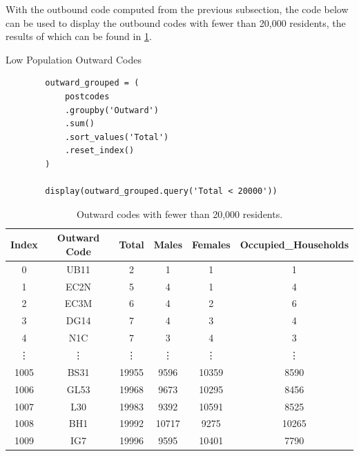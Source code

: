 \documentclass{article}
\begin{document}
With the outbound code computed from the previous subsection, the code below can be used to display the outbound codes with fewer than 20,000 residents, the results of which can be found in \cref{tbl:outbound_codes}.

\begin{mybox}[colbacktitle=green]{Low Population Outward Codes}
    \begin{verbatim}    
        outward_grouped = (
            postcodes
            .groupby('Outward')
            .sum()
            .sort_values('Total')
            .reset_index()
        )

        display(outward_grouped.query('Total < 20000'))

        \end{verbatim}
\end{mybox}


\begin{table}[H]
    \centering
    \caption{Outward codes with fewer than 20,000 residents.}
    \label{tbl:outbound_codes}
    \vspace{0.5\baselineskip}

    \begin{tabular}{@{}cccccc@{}}
    \toprule
    Index   &   Outward Code    & Total & Males & Females & Occupied\_Households \\ \midrule
    0       &   UB11            & 2     & 1     & 1       & 1                   \\
    1       &   EC2N            & 5     & 4     & 1       & 4                   \\
    2       &   EC3M            & 6     & 4     & 2       & 6                   \\
    3       &   DG14            & 7     & 4     & 3       & 4                   \\
    4       &   N1C             & 7     & 3     & 4       & 3                   \\
    \vdots  &   \vdots          & \vdots& \vdots & \vdots & \vdots              \\
    1005    &   BS31            & 19955 & 9596  & 10359   & 8590                \\
    1006    &   GL53            & 19968 & 9673  & 10295   & 8456                \\
    1007    &   L30             & 19983 & 9392  & 10591   & 8525                \\
    1008    &   BH1             & 19992 & 10717 & 9275    & 10265               \\
    1009    &   IG7             & 19996 & 9595  & 10401   & 7790                \\ \bottomrule
    \end{tabular}
\end{table}
\end{document}
